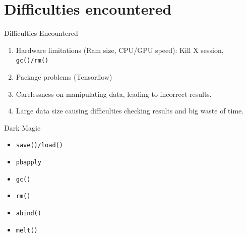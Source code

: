 \documentclass{beamer}
\begin{document}
\section{Difficulties encountered}%
\label{sec:difficulties_encountered}


\begin{frame}{Difficulties Encountered}
	\begin{enumerate}
		\item Hardware limitations (Ram size, CPU/GPU speed): Kill X session, \texttt{gc()/rm()}
		\item Package problems (Tensorflow)
		\item Carelessness on manipulating data, leading to incorrect results.
		\item Large data size causing difficulties checking results and big waste of time.
		

	\end{enumerate}
\end{frame}


\begin{frame}{Dark Magic}
	\begin{itemize}
		\item \texttt{save()/load()}
		\item \texttt{pbapply}
		\item \texttt{gc()}
		\item \texttt{rm()}
		\item \texttt{abind()}
		\item \texttt{melt()}

	\end{itemize}
	
\end{frame}
\end{document}
